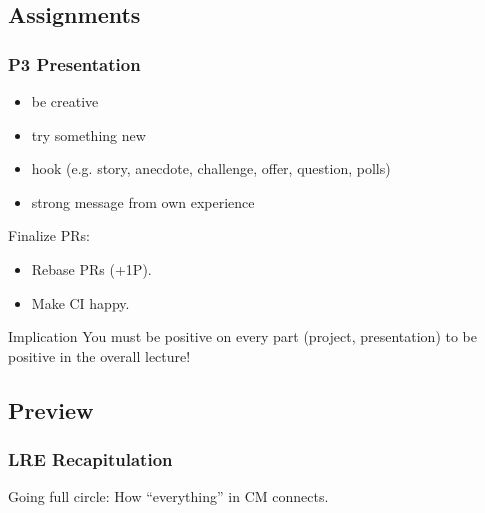 \breakframe

\subsection{Assignments}

\begin{assignment}
	\frametitle{P3 Presentation}

	\begin{itemize}
	\item be creative
	\item try something new
	\item hook (e.g. story, anecdote, challenge, offer, question, polls)
	\item strong message from own experience
	\end{itemize}
\end{assignment}

\begin{assignment}
	Finalize PRs:

	\begin{itemize} %
	\item Rebase PRs (+1P).
	\item Make CI happy.
	\end{itemize}

	\begin{alertblock}{Implication}
	You must be positive on every part (project, presentation) to be positive in the overall lecture!
	\end{alertblock}
\end{assignment}

\subsection{Preview}

\begin{frame}
	\frametitle{LRE Recapitulation}

	Going full circle: How ``everything'' in CM connects.
\end{frame}



\nocite{raab2017introducing}

\appendix

\begin{frame}[allowframebreaks]
	
	
\end{frame}



